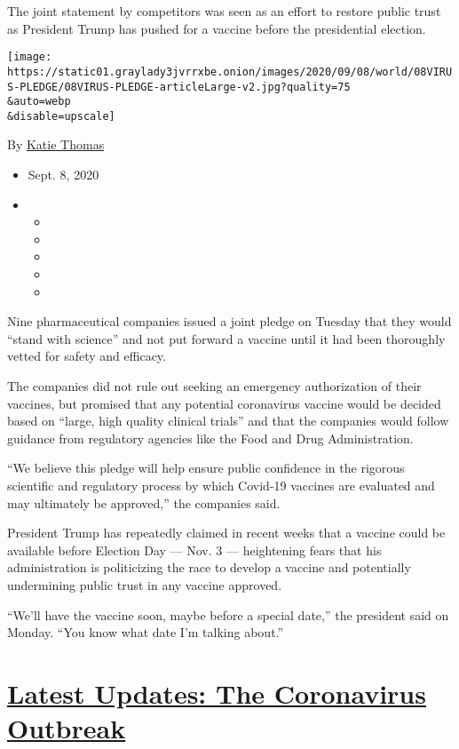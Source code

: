 The joint statement by competitors was seen as an effort to restore
public trust as President Trump has pushed for a vaccine before the
presidential election.

\texttt{[image: https://static01.graylady3jvrrxbe.onion/images/2020/09/08/world/08VIRUS-PLEDGE/08VIRUS-PLEDGE-articleLarge-v2.jpg?quality=75\\\&auto=webp\\\&disable=upscale]}

By \href{https://www.nytimes3xbfgragh.onion/by/katie-thomas}{Katie
Thomas}

\begin{itemize}
\item
  Sept. 8, 2020
\item
  \begin{itemize}
  \item
  \item
  \item
  \item
  \item
  \end{itemize}
\end{itemize}

Nine pharmaceutical companies issued a joint pledge on Tuesday that they
would ``stand with science'' and not put forward a vaccine until it had
been thoroughly vetted for safety and efficacy.

The companies did not rule out seeking an emergency authorization of
their vaccines, but promised that any potential coronavirus vaccine
would be decided based on ``large, high quality clinical trials'' and
that the companies would follow guidance from regulatory agencies like
the Food and Drug Administration.

``We believe this pledge will help ensure public confidence in the
rigorous scientific and regulatory process by which Covid-19 vaccines
are evaluated and may ultimately be approved,'' the companies said.

President Trump has repeatedly claimed in recent weeks that a vaccine
could be available before Election Day --- Nov. 3 --- heightening fears
that his administration is politicizing the race to develop a vaccine
and potentially undermining public trust in any vaccine approved.

``We'll have the vaccine soon, maybe before a special date,'' the
president said on Monday. ``You know what date I'm talking about.''

\hypertarget{latest-updates-the-coronavirus-outbreak}{%
\section{\texorpdfstring{\href{https://www.nytimes3xbfgragh.onion/2020/09/11/world/covid-19-coronavirus.html?action=click\&pgtype=Article\&state=default\&region=MAIN_CONTENT_1\&context=storylines_live_updates}{Latest
Updates: The Coronavirus
Outbreak}}{Latest Updates: The Coronavirus Outbreak}}\label{latest-updates-the-coronavirus-outbreak}}

